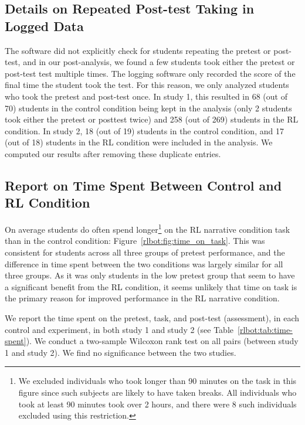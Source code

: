 \documentclass[sn-mathphys,Numbered]{sn-jnl}%
\theoremstyle{thmstyleone}%
\theoremstyle{thmstyletwo}%
\theoremstyle{thmstylethree}%
\begin{document}
\begin{appendices}
\subsection*{Details on Repeated Post-test Taking in Logged Data}

The software did not explicitly check for students repeating the pretest or post-test, and in our post-analysis, we found a few students took either the pretest or post-test test multiple times. The logging software only recorded the score of the final time the student took the test. For this reason, we only analyzed students who took the pretest and post-test once. In study 1, this resulted in 68 (out of 70) students in the control condition being kept in the analysis (only 2 students took either the pretest or posttest twice) and 258 (out of 269) students in the RL condition. In study 2, 18 (out of 19) students in the control condition, and 17 (out of 18) students in the RL condition were included in the analysis. We computed our results after removing these duplicate entries.

\subsection*{Report on Time Spent Between Control and RL Condition}

On average students do often spend longer\footnote{We excluded individuals who took longer than 90 minutes on the task in this figure since such subjects are likely to have taken breaks. All individuals who took at least 90 minutes took over 2 hours, and there were 8 such individuals excluded using this restriction.}  on the RL narrative condition task than in the control condition: Figure~\ref{rlbot:fig:time_on_task}. This was consistent for students across all three groups of pretest performance, and the difference in time spent between the two conditions was largely similar for all three groups. As it was only students in the low pretest group that seem to have a significant benefit from the RL condition, it seems unlikely that time on task is the primary reason for improved performance in the RL narrative condition. 

We report the time spent on the pretest, task, and post-test (assessment), in each control and experiment, in both study 1 and study 2 (see Table~\ref{rlbot:tab:time-spent}). We conduct a two-sample Wilcoxon rank test on all pairs (between study 1 and study 2). We find no significance between the two studies.


\end{appendices}
\end{document}
